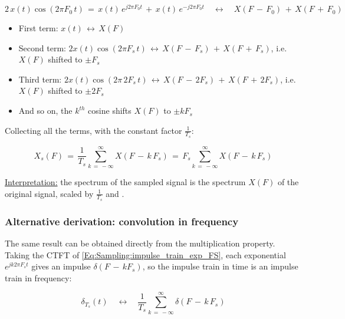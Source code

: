 \begin{equation}
2 \, x(t) \cos(2 \pi F_0 \, t) \, = \, x(t) \, e^{j 2 \pi F_0 t} \, + \, x(t) \, e^{-j 2 \pi F_0 t} \quad \longleftrightarrow \quad X(F \, - \, F_0) \, + \, X(F \, + \, F_0)
\label{Eq:Sampling:modulation_property}
\end{equation}

\begin{itemize}

\item First term: $x(t) \, \longleftrightarrow \, X(F)$

\item Second term: $2 x(t) \cos(2 \pi F_s \, t) \, \longleftrightarrow \, X(F \, - \, F_s) \, + \, X(F \, + \, F_s)$, i.e. $X(F)$ shifted to $\pm F_s$

\item Third term: $2 x(t) \cos(2 \pi \, 2 F_s \, t) \, \longleftrightarrow \, X(F \, - \, 2 F_s) \, + \, X(F \, + \, 2 F_s)$, i.e. $X(F)$ shifted to $\pm 2 F_s$

\item And so on, the $k^{th}$ cosine shifts $X(F)$ to $\pm k F_s$

\end{itemize}

Collecting all the terms, with the constant factor $\frac{1}{T_s}$:

\begin{equation}
\boxed{
X_s(F) \, = \, \frac{1}{T_s} \sum_{k \, = \, -\infty}^{\infty} X(F \, - \, k \, F_s) \, = \, F_s \sum_{k \, = \, -\infty}^{\infty} X(F \, - \, k \, F_s)
}
\label{Eq:Sampling:sampled_spectrum}
\end{equation}

\underline{Interpretation:} the spectrum of the sampled signal is the spectrum $X(F)$ of the original signal, scaled by $\frac{1}{T_s}$ and .

\subsubsection*{Alternative derivation: convolution in frequency}

The same result can be obtained directly from the multiplication property. Taking the CTFT of \autoref{Eq:Sampling:impulse_train_exp_FS}, each exponential $e^{j k 2 \pi F_s t}$ gives an impulse $\delta(F \, - \, k F_s)$, so the impulse train in time is an impulse train in frequency:

\begin{equation}
\delta_{T_s}(t) \quad \longleftrightarrow \quad \frac{1}{T_s} \sum_{k \, = \, -\infty}^{\infty} \delta(F \, - \, k \, F_s)
\end{equation}

